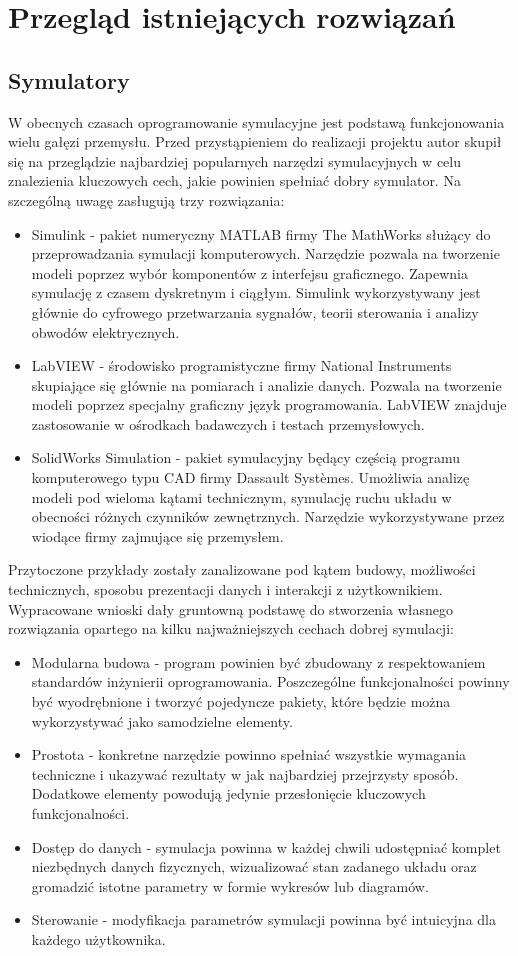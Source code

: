 \documentclass[12pt, oneside]{report}
\theoremstyle{definition}
\begin{document}
\section{Przegląd istniejących rozwiązań}
\subsection{Symulatory}
W obecnych czasach oprogramowanie symulacyjne jest podstawą funkcjonowania wielu gałęzi przemysłu. Przed przystąpieniem do realizacji projektu autor skupił się na przeglądzie najbardziej popularnych narzędzi symulacyjnych w celu znalezienia kluczowych cech, jakie powinien spełniać dobry symulator. Na szczególną uwagę zasługują trzy rozwiązania:
\begin{itemize}
\item Simulink - pakiet numeryczny MATLAB firmy The MathWorks służący do przeprowadzania symulacji komputerowych. Narzędzie pozwala na tworzenie modeli poprzez wybór komponentów z interfejsu graficznego. Zapewnia symulację z czasem dyskretnym i ciągłym. Simulink wykorzystywany jest głównie do cyfrowego przetwarzania sygnałów, teorii sterowania i analizy obwodów elektrycznych.
\item LabVIEW - środowisko programistyczne firmy National Instruments skupiające się głównie na pomiarach i analizie danych. Pozwala na tworzenie modeli poprzez specjalny graficzny język programowania. LabVIEW znajduje zastosowanie w ośrodkach badawczych i testach przemysłowych.
\item SolidWorks Simulation - pakiet symulacyjny będący częścią programu komputerowego typu CAD firmy Dassault Systèmes. Umożliwia analizę modeli pod wieloma kątami technicznym, symulację ruchu układu w obecności różnych czynników zewnętrznych. Narzędzie wykorzystywane przez wiodące firmy zajmujące się przemysłem.  
\end{itemize}

Przytoczone przykłady zostały zanalizowane pod kątem budowy, możliwości technicznych, sposobu prezentacji danych i interakcji z użytkownikiem. Wypracowane wnioski dały gruntowną podstawę do stworzenia własnego rozwiązania opartego na kilku najważniejszych cechach dobrej symulacji:
\begin{itemize}
\item Modularna budowa - program powinien być zbudowany z respektowaniem standardów inżynierii oprogramowania. Poszczególne funkcjonalności powinny być wyodrębnione i tworzyć pojedyncze pakiety, które będzie można wykorzystywać jako samodzielne elementy.
\item Prostota - konkretne narzędzie powinno spełniać wszystkie wymagania techniczne i ukazywać rezultaty w jak najbardziej przejrzysty sposób. Dodatkowe elementy powodują jedynie przesłonięcie kluczowych funkcjonalności.
\item Dostęp do danych - symulacja powinna w każdej chwili udostępniać komplet niezbędnych danych fizycznych, wizualizować stan zadanego układu oraz gromadzić istotne parametry w formie wykresów lub diagramów.
\item Sterowanie - modyfikacja parametrów symulacji powinna być intuicyjna dla każdego użytkownika.
\end{itemize}
\end{document}
